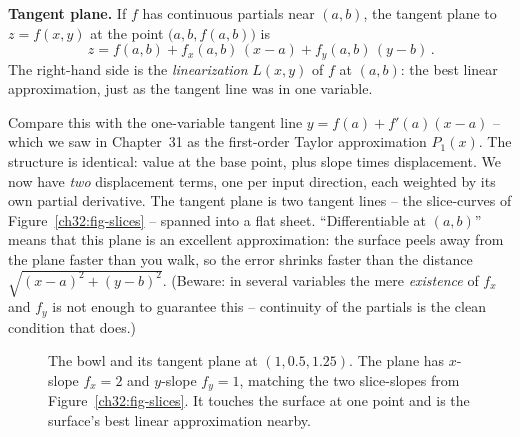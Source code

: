 \begin{focusbox}
\textbf{Tangent plane.} If $f$ has continuous partials near $(a,b)$, the tangent plane to
$z=f(x,y)$ at the point $\big(a,b,f(a,b)\big)$ is
\[
   \boxed{\,z = f(a,b) + f_x(a,b)\,(x-a) + f_y(a,b)\,(y-b)\,}.
\]
The right-hand side is the \emph{linearization} $L(x,y)$ of $f$ at $(a,b)$: the best
linear approximation, just as the tangent line was in one variable.
\end{focusbox}

\begin{happeningbox}
Compare this with the one-variable tangent line $y = f(a) + f'(a)(x-a)$ -- which we saw in
Chapter~31 as the first-order Taylor approximation $P_1(x)$. The structure is identical:
value at the base point, plus slope times displacement. We now have \emph{two} displacement
terms, one per input direction, each weighted by its own partial derivative. The tangent
plane is two tangent lines -- the slice-curves of Figure~\ref{ch32:fig-slices} -- spanned into a
flat sheet. ``Differentiable at $(a,b)$'' means that this plane is an excellent
approximation: the surface peels away from the plane faster than you walk, so the error shrinks
faster than the distance $\sqrt{(x-a)^2+(y-b)^2}$. (Beware: in several variables the mere
\emph{existence} of $f_x$ and $f_y$ is not enough to guarantee this -- continuity of the partials
is the clean condition that does.)
\end{happeningbox}

\begin{figure}[H]
\centering
{}
\caption{The bowl and its tangent plane at $(1,0.5,1.25)$. The plane has $x$-slope
$f_x=2$ and $y$-slope $f_y=1$, matching the two slice-slopes from
Figure~\ref{ch32:fig-slices}. It touches the surface at one point and is the surface's best
linear approximation nearby.}
\label{ch32:fig-tangentplane}
\end{figure}

